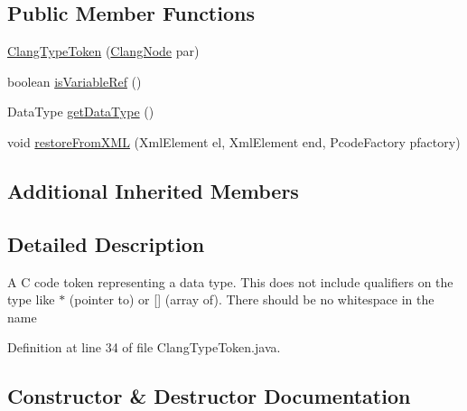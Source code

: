 \subsection*{Public Member Functions}
\begin{DoxyCompactItemize}
\item 
\mbox{\hyperlink{classghidra_1_1app_1_1decompiler_1_1_clang_type_token_af6cd96871f1a761c2f1638d74586307f}{Clang\+Type\+Token}} (\mbox{\hyperlink{interfaceghidra_1_1app_1_1decompiler_1_1_clang_node}{Clang\+Node}} par)
\item 
boolean \mbox{\hyperlink{classghidra_1_1app_1_1decompiler_1_1_clang_type_token_a7a4e9b090abd073689da89a7e22b42e7}{is\+Variable\+Ref}} ()
\item 
Data\+Type \mbox{\hyperlink{classghidra_1_1app_1_1decompiler_1_1_clang_type_token_a50303d0178e97d82fd2da90e4921bbe4}{get\+Data\+Type}} ()
\item 
void \mbox{\hyperlink{classghidra_1_1app_1_1decompiler_1_1_clang_type_token_a53a5c4775d9a1901b95b86bddbb990f0}{restore\+From\+X\+ML}} (Xml\+Element el, Xml\+Element end, Pcode\+Factory pfactory)
\end{DoxyCompactItemize}
\subsection*{Additional Inherited Members}


\subsection{Detailed Description}
A C code token representing a data type. This does not include qualifiers on the type like \textquotesingle{}$\ast$\textquotesingle{} (pointer to) or \textquotesingle{}\mbox{[}\mbox{]}\textquotesingle{} (array of). There should be no whitespace in the name 

Definition at line 34 of file Clang\+Type\+Token.\+java.



\subsection{Constructor \& Destructor Documentation}
\mbox{\label{classghidra_1_1app_1_1decompiler_1_1_clang_type_token_af6cd96871f1a761c2f1638d74586307f}} 
